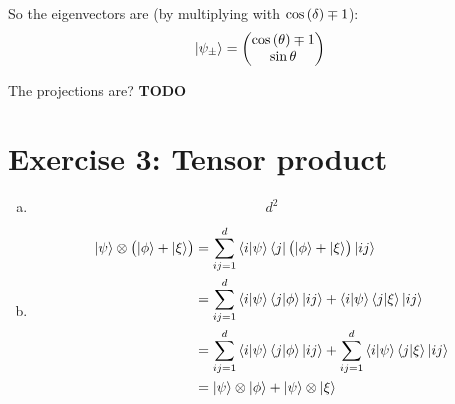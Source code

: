 \documentclass[a4paper,german,12pt,smallheadings]{scrartcl}
\begin{document}
\begin{enumerate}[a)]
    So the eigenvectors are (by multiplying with $\cos\del\delta \mp 1$):
    \begin{equation*}
    \ket{\psi_\pm} = \begin{pmatrix} \cos\del\theta \mp 1 \\ \sin\theta \end{pmatrix}
    \end{equation*}

    The projections are? \textbf{TODO}

\end{enumerate}

\section*{Exercise 3: Tensor product}
\begin{enumerate}[a)]
  \item
    \begin{equation*}
      d^2
    \end{equation*}
  \item
    \begin{align*}
      \ket{\psi} \otimes \del{\ket{\phi} + \ket{\xi}} &= \sum_{ij=1}^d \braket{i|\psi} \bra{j} \del{\ket\phi + \ket\xi} \ket{ij} \\
      &= \sum_{ij=1}^d \braket{i|\psi} \braket{j|\phi}\ket{ij} + \braket{i|\psi} \braket{j|\xi} \ket{ij} \\
      &= \sum_{ij=1}^d \braket{i|\psi} \braket{j|\phi}\ket{ij} + \sum_{ij=1}^d \braket{i|\psi} \braket{j|\xi} \ket{ij} \\
      &= \ket\psi \otimes \ket\phi + \ket\psi \otimes \ket\xi
    \end{align*}
\end{enumerate}
\end{document}
